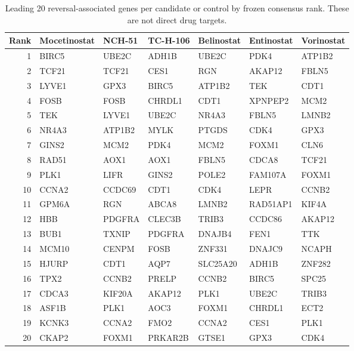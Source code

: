 \begingroup
\footnotesize
\begin{table}[H]
\centering
\caption{Leading 20 reversal-associated genes per candidate or control by frozen consensus rank. These are not direct drug targets.}
\label{tab:s_topgenes}
\begin{tabular}{@{}rllllll@{}}
\toprule
Rank & Mocetinostat & NCH-51 & TC-H-106 & Belinostat & Entinostat & Vorinostat \\
\midrule
1 & BIRC5 & UBE2C & ADH1B & UBE2C & PDK4 & ATP1B2 \\
2 & TCF21 & TCF21 & CES1 & RGN & AKAP12 & FBLN5 \\
3 & LYVE1 & GPX3 & BIRC5 & ATP1B2 & TEK & CDT1 \\
4 & FOSB & FOSB & CHRDL1 & CDT1 & XPNPEP2 & MCM2 \\
5 & TEK & LYVE1 & UBE2C & NR4A3 & FBLN5 & LMNB2 \\
6 & NR4A3 & ATP1B2 & MYLK & PTGDS & CDK4 & GPX3 \\
7 & GINS2 & MCM2 & PDK4 & MCM2 & FOXM1 & CLN6 \\
8 & RAD51 & AOX1 & AOX1 & FBLN5 & CDCA8 & TCF21 \\
9 & PLK1 & LIFR & GINS2 & POLE2 & FAM107A & FOXM1 \\
10 & CCNA2 & CCDC69 & CDT1 & CDK4 & LEPR & CCNB2 \\
11 & GPM6A & RGN & ABCA8 & LMNB2 & RAD51AP1 & KIF4A \\
12 & HBB & PDGFRA & CLEC3B & TRIB3 & CCDC86 & AKAP12 \\
13 & BUB1 & TXNIP & PDGFRA & DNAJB4 & FEN1 & TTK \\
14 & MCM10 & CENPM & FOSB & ZNF331 & DNAJC9 & NCAPH \\
15 & HJURP & CDT1 & AQP7 & SLC25A20 & ADH1B & ZNF282 \\
16 & TPX2 & CCNB2 & PRELP & CCNB2 & BIRC5 & SPC25 \\
17 & CDCA3 & KIF20A & AKAP12 & PLK1 & UBE2C & TRIB3 \\
18 & ASF1B & PLK1 & AOC3 & FOXM1 & CHRDL1 & ECT2 \\
19 & KCNK3 & CCNA2 & FMO2 & CCNA2 & CES1 & PLK1 \\
20 & CKAP2 & FOXM1 & PRKAR2B & GTSE1 & GPX3 & CDK4 \\
\bottomrule
\end{tabular}
\end{table}
\endgroup
